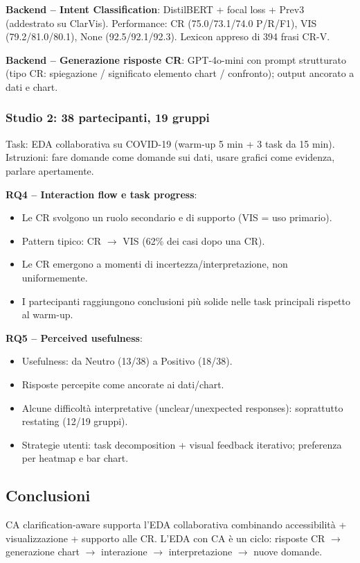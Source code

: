 \documentclass[a4paper,12pt]{article}
\begin{document}
\textbf{Backend -- Intent Classification}: DistilBERT + focal loss + Prev3 (addestrato su ClarVis). Performance: CR (75.0/73.1/74.0 P/R/F1), VIS (79.2/81.0/80.1), None (92.5/92.1/92.3). Lexicon appreso di 394 frasi CR-V.

\textbf{Backend -- Generazione risposte CR}: GPT-4o-mini con prompt strutturato (tipo CR: spiegazione / significato elemento chart / confronto); output ancorato a dati e chart.

\subsubsection{Studio 2: 38 partecipanti, 19 gruppi}
Task: EDA collaborativa su COVID-19 (warm-up 5 min + 3 task da 15 min). Istruzioni: fare domande come domande sui dati, usare grafici come evidenza, parlare apertamente.

\textbf{RQ4 -- Interaction flow e task progress}:
\begin{itemize}
    \item Le CR svolgono un ruolo secondario e di supporto (VIS = uso primario).
    \item Pattern tipico: CR $\to$ VIS (62\% dei casi dopo una CR).
    \item Le CR emergono a momenti di incertezza/interpretazione, non uniformemente.
    \item I partecipanti raggiungono conclusioni pi\`u solide nelle task principali rispetto al warm-up.
\end{itemize}

\textbf{RQ5 -- Perceived usefulness}:
\begin{itemize}
    \item Usefulness: da Neutro (13/38) a Positivo (18/38).
    \item Risposte percepite come ancorate ai dati/chart.
    \item Alcune difficolt\`a interpretative (unclear/unexpected responses): soprattutto restating (12/19 gruppi).
    \item Strategie utenti: task decomposition + visual feedback iterativo; preferenza per heatmap e bar chart.
\end{itemize}

\subsection{Conclusioni}
CA clarification-aware supporta l'EDA collaborativa combinando accessibilit\`a + visualizzazione + supporto alle CR. L'EDA con CA \`e un ciclo: risposte CR $\to$ generazione chart $\to$ interazione $\to$ interpretazione $\to$ nuove domande.
\end{document}
